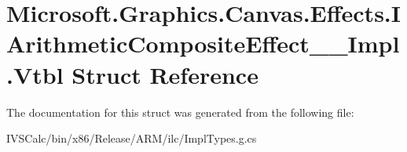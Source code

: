 \hypertarget{struct_microsoft_1_1_graphics_1_1_canvas_1_1_effects_1_1_i_arithmetic_composite_effect_____impl_1_1_vtbl}{}\section{Microsoft.\+Graphics.\+Canvas.\+Effects.\+I\+Arithmetic\+Composite\+Effect\+\_\+\+\_\+\+Impl.\+Vtbl Struct Reference}
\label{struct_microsoft_1_1_graphics_1_1_canvas_1_1_effects_1_1_i_arithmetic_composite_effect_____impl_1_1_vtbl}


The documentation for this struct was generated from the following file\+:\begin{DoxyCompactItemize}
\item 
I\+V\+S\+Calc/bin/x86/\+Release/\+A\+R\+M/ilc/Impl\+Types.\+g.\+cs\end{DoxyCompactItemize}
